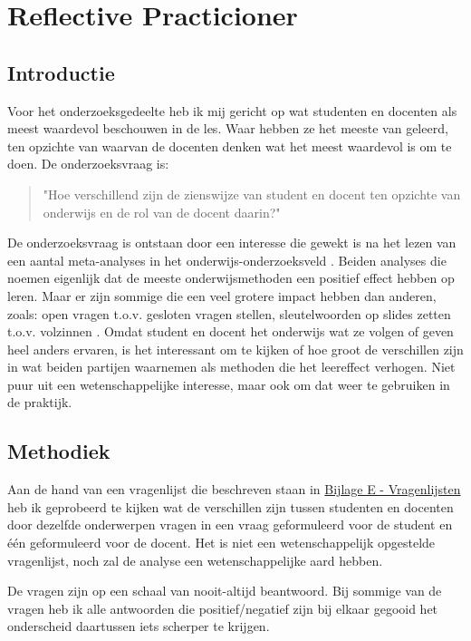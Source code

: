 
\section{Reflective Practicioner}
\label{sec:RP}
\subsection{Introductie}
Voor het onderzoeksgedeelte heb ik mij gericht op wat studenten en docenten als meest waardevol beschouwen in de les. Waar hebben ze het meeste van geleerd, ten opzichte van waarvan de docenten denken wat het meest waardevol is om te doen. De onderzoeksvraag is:
\begin{quote}
  "Hoe verschillend zijn de zienswijze van student en docent ten opzichte van onderwijs en de rol van de docent daarin?"
\end{quote}
De onderzoeksvraag is ontstaan door een interesse die gewekt is na het lezen van een aantal meta-analyses in het onderwijs-onderzoeksveld \cite{hattie2008visible, schneiderVariables}. Beiden analyses die noemen eigenlijk dat de meeste onderwijsmethoden een positief effect hebben op leren. Maar er zijn sommige die een veel grotere impact hebben dan anderen, zoals: open vragen t.o.v. gesloten vragen stellen, sleutelwoorden op slides zetten t.o.v. volzinnen \cite{schneiderVariables}. Omdat student en docent het onderwijs wat ze volgen of geven heel anders ervaren, is het interessant om te kijken of hoe groot de verschillen zijn in wat beiden partijen waarnemen als methoden die het leereffect verhogen. Niet puur uit een wetenschappelijke interesse, maar ook om dat weer te gebruiken in de praktijk.

\subsection{Methodiek}
Aan de hand van een vragenlijst die beschreven staan in \hyperref[sec:vragenlijstRP]{Bijlage E - Vragenlijsten} heb ik geprobeerd te kijken wat de verschillen zijn tussen studenten en docenten door dezelfde onderwerpen vragen in een vraag geformuleerd voor de student en één geformuleerd voor de docent. Het is niet een wetenschappelijk opgestelde vragenlijst, noch zal de analyse een wetenschappelijke aard hebben.

De vragen zijn op een schaal van nooit-altijd beantwoord. Bij sommige van de vragen heb ik alle antwoorden die positief/negatief zijn bij elkaar gegooid het onderscheid daartussen iets scherper te krijgen.

